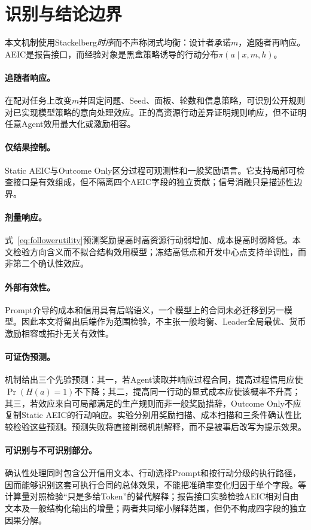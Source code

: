 \section{识别与结论边界}\label{sec:identification}
本文机制使用Stackelberg\emph{时序}而不声称闭式均衡：设计者承诺$m$，追随者再响应。AEIC是报告接口，而经验对象是黑盒策略诱导的行动分布$\pi(a\mid x,m,h)$。

\paragraph{追随者响应。}在配对任务上改变$m$并固定问题、Seed、面板、轮数和信息策略，可识别公开规则对已实现模型策略的意向处理效应。正的高资源行动差异证明规则响应，但不证明任意Agent效用最大化或激励相容。

\paragraph{仅结果控制。}Static AEIC与Outcome Only区分过程可观测性和一般奖励语言。它支持局部可检查接口是有效组成，但不隔离四个AEIC字段的独立贡献；信号消融只是描述性边界。

\paragraph{剂量响应。}式~\eqref{eq:followerutility}预测奖励提高时高资源行动弱增加、成本提高时弱降低。本文检验方向含义而不拟合结构效用模型；冻结高低点和开发中心点支持单调性，而非第二个确认性效应。

\paragraph{外部有效性。}Prompt介导的成本和信用具有后端语义，一个模型上的合同未必迁移到另一模型。因此本文将留出后端作为范围检验，不主张一般均衡、Leader全局最优、货币激励相容或拓扑无关有效性。

\paragraph{可证伪预测。}机制给出三个先验预测：其一，若Agent读取并响应过程合同，提高过程信用应使$\Pr(H(a)=1)$不下降；其二，提高同一行动的显式成本应使该概率不升高；其三，若效应来自可局部满足的生产规则而非一般奖励措辞，Outcome Only不应复制Static AEIC的行动响应。实验分别用奖励扫描、成本扫描和三条件确认性比较检验这些预测。预测失败将直接削弱机制解释，而不是被事后改写为提示效果。

\paragraph{可识别与不可识别部分。}确认性处理同时包含公开信用文本、行动选择Prompt和按行动分级的执行路径，因而能够识别这套可执行合同的总体效果，不能把准确率变化归因于单个字段。等计算量对照检验“只是多给Token”的替代解释；报告接口实验检验AEIC相对自由文本及一般结构化输出的增量；两者共同缩小解释范围，但仍不构成四字段的独立因果分解。
